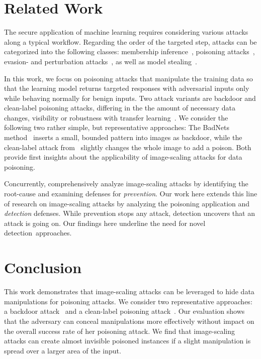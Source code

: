 \documentclass[conference]{IEEEtran}
\begin{document}
 
\section{Related Work}\label{sec:relatedwork}
The secure application of machine learning requires considering 
various attacks along a typical workflow. 
Regarding the order of the targeted step, attacks can be
categorized into the following classes:
membership inference~\citep[e.g.,][]{ShoStrSonShm17}, poisoning 
attacks~\citep[e.g.,][]{BigNelLas11, GuDolGar17, LiuMaAaf+18}, 
evasion- and perturbation
attacks~\citep[e.g.,][]{BigCorMai+13,CarWag17,QuiMaiRie19}, as
well as model stealing~\citep[e.g.,][]{TraZhaJuel+16}.

In this work, we focus on poisoning attacks that manipulate the 
training data so that the learning model returns targeted 
responses with adversarial inputs only while behaving normally for 
benign inputs. Two attack variants are backdoor and clean-label 
poisoning attacks, differing in the the amount of necessary data 
changes, visibility or robustness with transfer 
learning~\citep[e.g.][]{GuDolGar17, CheLiuLi+17, ShaHuaNaj+18, 
LiuMaAaf+18, YaoLiZhe+19}. 
We consider the following two rather simple, but representative 
approaches:
The BadNets method~\citep{GuDolGar17} inserts a small, bounded pattern 
into images as backdoor, while the clean-label attack 
from~\citet{ShaHuaNaj+18} slightly changes the whole image to add a 
poison. Both provide first insights about the 
applicability of image-scaling attacks for data poisoning.

Concurrently, \citet{QuiKleArp20} comprehensively analyze 
image-scaling attacks by identifying the root-cause and examining
defenses for \emph{prevention}. Our work here extends this line of 
research on image-scaling attacks by analyzing the poisoning 
application and \emph{detection} defenses.  While prevention stops any 
attack, detection uncovers that an attack is going on. Our findings 
here underline the need for novel detection~approaches.








\section{Conclusion}\label{sec:conclusion}
This work demonstrates that image-scaling attacks can be 
leveraged to hide data manipulations for poisoning attacks. We consider 
two representative approaches: a backdoor attack~\citep{GuDolGar17} and 
a clean-label poisoning attack~\citep{ShaHuaNaj+18}. Our evaluation 
shows that the adversary can conceal manipulations more effectively 
without impact on the overall success rate of her poisoning attack. 
We find that image-scaling attacks can create almost invisible poisoned 
instances if a slight manipulation is spread over a larger area of the 
input.
\end{document}
